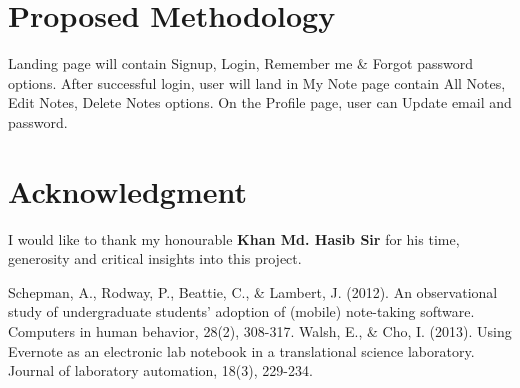 \documentclass[conference]{IEEEtran}
\begin{document}
\section{Proposed Methodology}

Landing page will contain Signup, Login, Remember me \& Forgot password options. After successful login, user will land in My Note page contain All Notes, Edit Notes, Delete Notes options. On the Profile page, user can Update email and password.




\section*{Acknowledgment}

I would like to thank my honourable\textbf{ Khan Md. Hasib Sir} for his time, generosity and critical insights into this project.




\begin{thebibliography}{00}
 Schepman, A., Rodway, P., Beattie, C., \& Lambert, J. (2012). An observational study of undergraduate students’ adoption of (mobile) note-taking software. Computers in human behavior, 28(2), 308-317.
 Walsh, E., \& Cho, I. (2013). Using Evernote as an electronic lab notebook in a translational science laboratory. Journal of laboratory automation, 18(3), 229-234.

\end{thebibliography}
\vspace{12pt}
\end{document}
